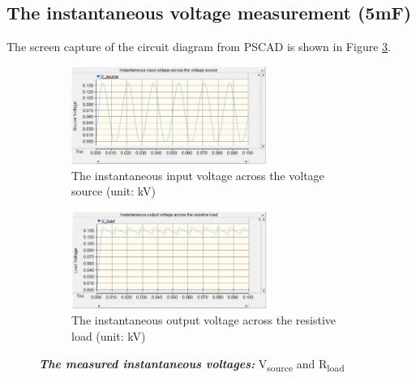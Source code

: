 \documentclass[12pt]{report} %
\begin{document}
\subsection{The instantaneous voltage measurement (5mF)} 
The screen capture of the circuit diagram from PSCAD is shown in Figure \ref{fig:Q1A2Figure}. 
\begin{figure}[H] %
    \centering %
    \begin{subfigure}[b]{\textwidth}
        \centering
        \includegraphics[width=0.7\textwidth]{Image/Q1/Q1_a2_Vsource.PNG}
        \caption{The instantaneous input voltage across the voltage source (unit: kV)}
        \label{fig:Q1A2sub1}
    \end{subfigure}
    \hfill
    \centering %
    \begin{subfigure}[b]{\textwidth}
        \centering
        \includegraphics[width=0.7\textwidth]{Image/Q1/Q1_a2_Vload.PNG}
        \caption{The instantaneous output voltage across the resistive load (unit: kV)}
        \label{fig:Q1A2sub2}
    \end{subfigure} 
    \caption[The measured instantaneous voltages with 5mF capacitor]
    {\centering \textit{\textbf{The measured instantaneous voltages:}} V\textsubscript{source} and R\textsubscript{load}}
    \label{fig:Q1A2Figure}
\end{figure}
\end{document}
